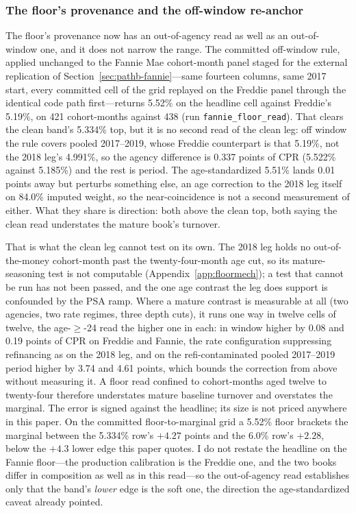 \subsubsection{The floor's provenance and the off-window re-anchor}

The floor's provenance now has an out-of-agency read as well as an out-of-window one, and it does not narrow the range. The committed off-window rule, applied unchanged to the Fannie Mae cohort-month panel staged for the external replication of Section~\ref{sec:pathb-fannie}---same fourteen columns, same 2017 start, every committed cell of the grid replayed on the Freddie panel through the identical code path first---returns 5.52\% on the headline cell against Freddie's 5.19\%, on 421 cohort-months against 438 (run \texttt{fannie\_floor\_read}). That clears the clean band's 5.334\% top, but it is no second read of the clean leg: off window the rule covers pooled 2017--2019, whose Freddie counterpart is that 5.19\%, not the 2018 leg's 4.991\%, so the agency difference is 0.337 points of CPR (5.522\% against 5.185\%) and the rest is period. The age-standardized 5.51\% lands 0.01 points away but perturbs something else, an age correction to the 2018 leg itself on 84.0\% imputed weight, so the near-coincidence is not a second measurement of either. What they share is direction: both above the clean top, both saying the clean read understates the mature book's turnover.

That is what the clean leg cannot test on its own. The 2018 leg holds no out-of-the-money cohort-month past the twenty-four-month age cut, so its mature-seasoning test is not computable (Appendix~\ref{app:floormech}); a test that cannot be run has not been passed, and the one age contrast the leg does support is confounded by the PSA ramp. Where a mature contrast is measurable at all (two agencies, two rate regimes, three depth cuts), it runs one way in twelve cells of twelve, the age-$\geq$-24 read the higher one in each: in window higher by 0.08 and 0.19 points of CPR on Freddie and Fannie, the rate configuration suppressing refinancing as on the 2018 leg, and on the refi-contaminated pooled 2017--2019 period higher by 3.74 and 4.61 points, which bounds the correction from above without measuring it. A floor read confined to cohort-months aged twelve to twenty-four therefore understates mature baseline turnover and overstates the marginal. The error is signed against the headline; its size is not priced anywhere in this paper. On the committed floor-to-marginal grid a 5.52\% floor brackets the marginal between the 5.334\% row's $+4.27$ points and the 6.0\% row's $+2.28$, below the $+4.3$ lower edge this paper quotes. I do not restate the headline on the Fannie floor---the production calibration is the Freddie one, and the two books differ in composition as well as in this read---so the out-of-agency read establishes only that the band's \emph{lower} edge is the soft one, the direction the age-standardized caveat already pointed.


